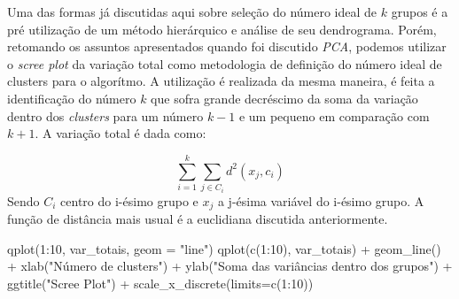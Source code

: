 \documentclass[
  letterpaper,
  DIV=11,
  numbers=noendperiod]{scrreprt}
\newenvironment{Shaded}{\begin{snugshade}}{\end{snugshade}}
\newcommand{\AttributeTok}[1]{\textcolor[rgb]{0.40,0.45,0.13}{#1}}
\newcommand{\ControlFlowTok}[1]{\textcolor[rgb]{0.00,0.23,0.31}{#1}}
\newcommand{\DecValTok}[1]{\textcolor[rgb]{0.68,0.00,0.00}{#1}}
\newcommand{\FunctionTok}[1]{\textcolor[rgb]{0.28,0.35,0.67}{#1}}
\newcommand{\NormalTok}[1]{\textcolor[rgb]{0.00,0.23,0.31}{#1}}
\newcommand{\OtherTok}[1]{\textcolor[rgb]{0.00,0.23,0.31}{#1}}
\newcommand{\SpecialCharTok}[1]{\textcolor[rgb]{0.37,0.37,0.37}{#1}}
\newcommand{\StringTok}[1]{\textcolor[rgb]{0.13,0.47,0.30}{#1}}
\begin{document}
Uma das formas já discutidas aqui sobre seleção do número ideal de \(k\)
grupos é a pré utilização de um método hierárquico e análise de seu
dendrograma. Porém, retomando os assuntos apresentados quando foi
discutido \emph{PCA}, podemos utilizar o \emph{scree plot} da variação
total como metodologia de definição do número ideal de clusters para o
algorítmo. A utilização é realizada da mesma maneira, é feita a
identificação do número \(k\) que sofra grande decréscimo da soma da
variação dentro dos \emph{clusters} para um número \(k-1\) e um pequeno
em comparação com \(k+1\). A variação total é dada como:

\[
\sum^k_{i=1}\sum_{j\in C_i}d^2(x_j,c_i)
\] Sendo \(C_i\) centro do i-ésimo grupo e \(x_j\) a j-ésima variável do
i-ésimo grupo. A função de distância mais usual é a euclidiana discutida
anteriormente.

\begin{Shaded}
\end{Shaded}

\begin{Shaded}
\begin{Highlighting}[]
\FunctionTok{qplot}\NormalTok{(}\DecValTok{1}\SpecialCharTok{:}\DecValTok{10}\NormalTok{, var\_totais, }\AttributeTok{geom =} \StringTok{"line"}\NormalTok{)}
\FunctionTok{qplot}\NormalTok{(}\FunctionTok{c}\NormalTok{(}\DecValTok{1}\SpecialCharTok{:}\DecValTok{10}\NormalTok{), var\_totais) }\SpecialCharTok{+} 
  \FunctionTok{geom\_line}\NormalTok{() }\SpecialCharTok{+} 
  \FunctionTok{xlab}\NormalTok{(}\StringTok{"Número de clusters"}\NormalTok{) }\SpecialCharTok{+} 
  \FunctionTok{ylab}\NormalTok{(}\StringTok{"Soma das variâncias dentro dos grupos"}\NormalTok{) }\SpecialCharTok{+}
  \FunctionTok{ggtitle}\NormalTok{(}\StringTok{"Scree Plot"}\NormalTok{) }\SpecialCharTok{+}
  \FunctionTok{scale\_x\_discrete}\NormalTok{(}\AttributeTok{limits=}\FunctionTok{c}\NormalTok{(}\DecValTok{1}\SpecialCharTok{:}\DecValTok{10}\NormalTok{))}
\end{Highlighting}
\end{Shaded}
\end{document}
